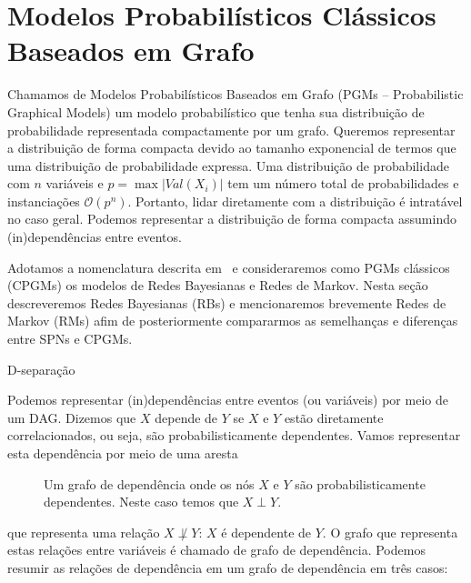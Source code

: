 \documentclass{amsart}
\makeatletter
\def\subsection{\@startsection{subsection}{3}%
  \z@{.5\linespacing\@plus.7\linespacing}{.1\linespacing}%
  {\normalfont\itshape}}
\theoremstyle{plain}
\numberwithin{equation}{subsection}
\newcommand{\bigo}{\mathcal{O}}
\makeatother
\begin{document}
\section{Modelos Probabilísticos Clássicos Baseados em Grafo}

Chamamos de Modelos Probabilísticos Baseados em Grafo (PGMs -- Probabilistic Graphical Models) um
modelo probabilístico que tenha sua distribuição de probabilidade representada compactamente por um
grafo. Queremos representar a distribuição de forma compacta devido ao tamanho exponencial de
termos que uma distribuição de probabilidade expressa. Uma distribuição de probabilidade com $n$
variáveis e $p = \max |Val(X_i)|$ tem um número total de probabilidades e instanciações
$\bigo(p^n)$. Portanto, lidar diretamente com a distribuição é intratável no caso geral. Podemos
representar a distribuição de forma compacta assumindo (in)dependências entre eventos.

Adotamos a nomenclatura descrita em~\cite{peharz-spn} e consideraremos como PGMs clássicos (CPGMs)
os modelos de Redes Bayesianas e Redes de Markov. Nesta seção descreveremos Redes Bayesianas (RBs)
e mencionaremos brevemente Redes de Markov (RMs) afim de posteriormente compararmos as semelhanças
e diferenças entre SPNs e CPGMs.

\subsection{D-separação}

Podemos representar (in)dependências entre eventos (ou variáveis) por meio de um DAG\@. Dizemos que
$X$ depende de $Y$ se $X$ e $Y$ estão diretamente correlacionados, ou seja, são probabilisticamente
dependentes. Vamos representar esta dependência por meio de uma aresta

\begin{figure}[h]
  \caption{Um grafo de dependência onde os nós $X$ e $Y$ são probabilisticamente dependentes. Neste
  caso temos que $X\perp Y$.}
\end{figure}

que representa uma relação $X\not\perp Y$: $X$ é dependente de $Y$. O grafo que representa estas
relações entre variáveis é chamado de grafo de dependência. Podemos resumir as relações de
dependência em um grafo de dependência em três casos:
\end{document}
